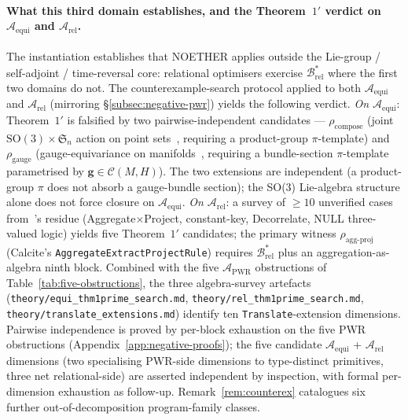\documentclass[acmsmall, screen]{acmart}
\begin{document}
\paragraph{What this third domain establishes, and the Theorem~$1'$ verdict on $\mathcal{A}_{\mathrm{equi}}$ and $\mathcal{A}_{\mathrm{rel}}$.}
The instantiation establishes that NOETHER applies outside the Lie-group / self-adjoint / time-reversal core: relational optimisers exercise $\mathcal{B}^{*}_{\mathrm{rel}}$ where the first two domains do not. The counterexample-search protocol applied to both $\mathcal{A}_{\mathrm{equi}}$ and $\mathcal{A}_{\mathrm{rel}}$ (mirroring \S\ref{subsec:negative-pwr}) yields the following verdict. \emph{On $\mathcal{A}_{\mathrm{equi}}$}: Theorem~$1'$ is falsified by two pairwise-independent candidates --- $\rho_{\mathrm{compose}}$ (joint $\mathrm{SO}(3) \times \mathfrak{S}_n$ action on point sets~\cite{Satorras2021EGNN}, requiring a product-group $\pi$-template) and $\rho_{\mathrm{gauge}}$ (gauge-equivariance on manifolds~\cite{Cohen2019Gauge}, requiring a bundle-section $\pi$-template parametrised by $\mathbf{g} \in \mathcal{C}(M,H)$). The two extensions are independent (a product-group $\pi$ does not absorb a gauge-bundle section); the SO(3) Lie-algebra structure alone does not force closure on $\mathcal{A}_{\mathrm{equi}}$. \emph{On $\mathcal{A}_{\mathrm{rel}}$}: a survey of $\ge 10$ unverified cases from~\cite{Wang2024QED}'s residue (Aggregate$\times$Project, constant-key, Decorrelate, NULL three-valued logic) yields five Theorem~$1'$ candidates; the primary witness $\rho_{\mathrm{agg\text{-}proj}}$ (Calcite's \texttt{AggregateExtractProjectRule}) requires $\mathcal{B}^{*}_{\mathrm{rel}}$ plus an aggregation-as-algebra ninth block. Combined with the five $\mathcal{A}_{\mathrm{PWR}}$ obstructions of Table~\ref{tab:five-obstructions}, the three algebra-survey artefacts (\texttt{theory/equi\_thm1prime\_search.md}, \texttt{theory/rel\_thm1prime\_search.md}, \texttt{theory/translate\_extensions.md}) identify ten \texttt{Translate}-extension dimensions. Pairwise independence is proved by per-block exhaustion on the five PWR obstructions (Appendix~\ref{app:negative-proofs}); the five candidate $\mathcal{A}_{\mathrm{equi}}$ + $\mathcal{A}_{\mathrm{rel}}$ dimensions (two specialising PWR-side dimensions to type-distinct primitives, three net relational-side) are asserted independent by inspection, with formal per-dimension exhaustion as follow-up. Remark~\ref{rem:counterex} catalogues six further out-of-decomposition program-family classes.
\end{document}
